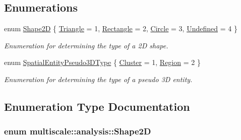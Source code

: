 \subsection*{\-Enumerations}
\begin{DoxyCompactItemize}
\item 
enum \hyperlink{namespacemultiscale_1_1analysis_ad1ef6155ab2e954c1c33d3e2e6b53fbf}{\-Shape2\-D} \{ \hyperlink{namespacemultiscale_1_1analysis_ad1ef6155ab2e954c1c33d3e2e6b53fbfaa93f37adbed49c6062576ec26eb845f7}{\-Triangle} =  1, 
\hyperlink{namespacemultiscale_1_1analysis_ad1ef6155ab2e954c1c33d3e2e6b53fbfa79a965ce5faa97f66ce875245491fde4}{\-Rectangle} =  2, 
\hyperlink{namespacemultiscale_1_1analysis_ad1ef6155ab2e954c1c33d3e2e6b53fbfabad5f35f59b929029fa140abb514a654}{\-Circle} =  3, 
\hyperlink{namespacemultiscale_1_1analysis_ad1ef6155ab2e954c1c33d3e2e6b53fbfa6df4f8bcba37302a9fa3d9887b2c3a13}{\-Undefined} =  4
 \}
\begin{DoxyCompactList}\small\item\em \-Enumeration for determining the type of a 2\-D shape. \end{DoxyCompactList}\item 
enum \hyperlink{namespacemultiscale_1_1analysis_a8f337e7ea9c75ff3ff2b3fe76fe7b5b6}{\-Spatial\-Entity\-Pseudo3\-D\-Type} \{ \hyperlink{namespacemultiscale_1_1analysis_a8f337e7ea9c75ff3ff2b3fe76fe7b5b6a09a919e43621e3a399a0711d01dd9ea5}{\-Cluster} =  1, 
\hyperlink{namespacemultiscale_1_1analysis_a8f337e7ea9c75ff3ff2b3fe76fe7b5b6a848cee53256419aaece3cba09652ddf4}{\-Region} =  2
 \}
\begin{DoxyCompactList}\small\item\em \-Enumeration for determining the type of a pseudo 3\-D entity. \end{DoxyCompactList}\end{DoxyCompactItemize}


\subsection{\-Enumeration \-Type \-Documentation}
\hypertarget{namespacemultiscale_1_1analysis_ad1ef6155ab2e954c1c33d3e2e6b53fbf}{
\subsubsection[{\-Shape2\-D}]{\setlength{\rightskip}{0pt plus 5cm}enum {\bf multiscale\-::analysis\-::\-Shape2\-D}}}\label{namespacemultiscale_1_1analysis_ad1ef6155ab2e954c1c33d3e2e6b53fbf}


